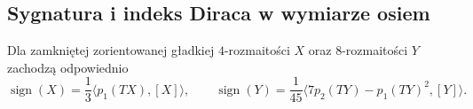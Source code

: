 \subsection*{Sygnatura i indeks Diraca w wymiarze osiem}

\begin{twierdzenie}
\label{thm:hodge-signature-index}
Dla zamkniętej zorientowanej gładkiej
\(4\)-rozmaitości \(X\) oraz \(8\)-rozmaitości \(Y\)
zachodzą odpowiednio
\begin{equation}\label{eq:hodge-signature-polynomials}
 \operatorname{sign}(X)
   =\frac13\langle p_1(TX),[X]\rangle,\qquad
 \operatorname{sign}(Y)
   =\frac1{45}
       \langle7p_2(TY)-p_1(TY)^2,[Y]\rangle.
\end{equation}
\end{twierdzenie}
